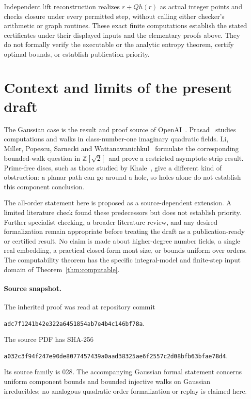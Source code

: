 \documentclass[11pt]{article}
\numberwithin{equation}{section}
\theoremstyle{definition}\newtheorem{definition}[theorem]{Definition}
\theoremstyle{remark}\newtheorem{remark}[theorem]{Remark}
\newcommand{\Z}{\mathbb Z}\newcommand{\Q}{\mathbb Q}\newcommand{\R}{\mathbb R}
\begin{document}
Independent lift reconstruction realizes $r+Qh(r)$ as actual integer points and checks closure under every permitted step, without calling either checker's arithmetic or graph routines. These exact finite computations establish the stated certificates under their displayed inputs and the elementary proofs above. They do not formally verify the executable or the analytic entropy theorem, certify optimal bounds, or establish publication priority.

\section{Context and limits of the present draft}

The Gaussian case is the result and proof source of OpenAI~\cite{openai}. Prasad~\cite{prasad} studies computations and walks in class-number-one imaginary quadratic fields. Li, Miller, Popescu, Sarnecki and Wattanawanichkul~\cite{li} formulate the corresponding bounded-walk question in $\Z[\sqrt2]$ and prove a restricted asymptote-strip result. Prime-free discs, such as those studied by Khale~\cite{khale}, give a different kind of obstruction: a planar path can go around a hole, so holes alone do not establish this component conclusion.

The all-order statement here is proposed as a source-dependent extension. A limited literature check found these predecessors but does not establish priority. Further specialist checking, a broader literature review, and any desired formalization remain appropriate before treating the draft as a publication-ready or certified result. No claim is made about higher-degree number fields, a single real embedding, a practical closed-form moat size, or bounds uniform over orders. The computability theorem has the specific integral-model and finite-step input domain of Theorem~\ref{thm:computable}.

\paragraph{Source snapshot.}
The inherited proof was read at repository commit
\begin{center}\small\texttt{adc7f1241b42e322a6451854ab7e4b4c146bf78a}.\end{center}
The source PDF has SHA-256
\begin{center}\small\texttt{a032c3f94f247e90de8077457439a0aad38325ae6f2557c2d08bfb63bfae78d4}.\end{center}
Its source family is 028. The accompanying Gaussian formal statement concerns uniform component bounds and bounded injective walks on Gaussian irreducibles; no analogous quadratic-order formalization or replay is claimed here.
\end{document}
